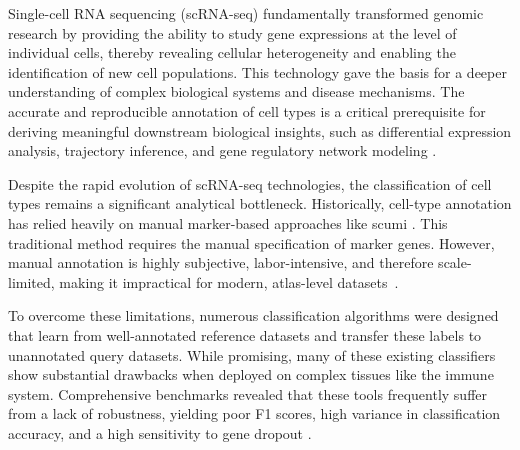 \documentclass[11pt]{article}
\begin{document}


Single-cell RNA sequencing (scRNA-seq) fundamentally transformed genomic research by providing the ability to study gene expressions at the level of individual cells, thereby revealing cellular heterogeneity and enabling the identification of new cell populations. This technology gave the basis for a deeper understanding of complex biological systems and disease mechanisms.
The accurate and reproducible annotation of cell types is a critical prerequisite for deriving meaningful downstream biological insights, such as differential expression analysis, trajectory inference, and gene regulatory network modeling \cite{abdelaal_comparison_2019, luecken_current_2019}.


Despite the rapid evolution of scRNA-seq technologies, the classification of cell types remains a significant analytical bottleneck. Historically, cell-type annotation has relied heavily on manual marker-based approaches like scumi \cite{ding_systematic_2020}. This traditional method requires the manual specification of marker genes. However, manual annotation is highly subjective, labor-intensive, and therefore scale-limited, making it impractical for modern, atlas-level datasets~\cite{abdelaal_comparison_2019}.

To overcome these limitations, numerous classification algorithms were designed that learn from well-annotated reference datasets and transfer these labels to unannotated query datasets. While promising, many of these existing classifiers show substantial drawbacks when deployed on complex tissues like the immune system. Comprehensive benchmarks revealed that these tools frequently suffer from a lack of robustness, yielding poor F1 scores, high variance in classification accuracy, and a high sensitivity to gene dropout \cite{abdelaal_comparison_2019}. %
\end{document}
